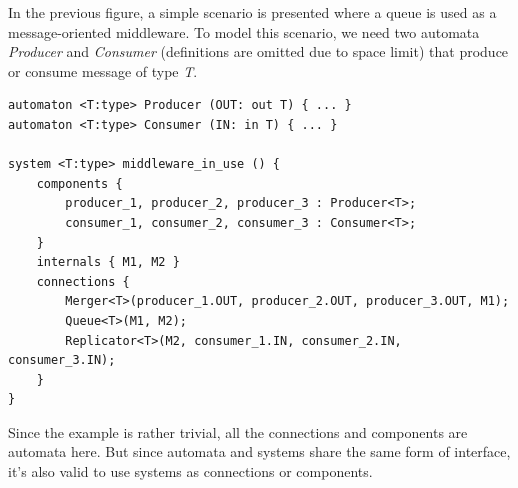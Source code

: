 \begin{example} In the previous figure, a simple scenario is presented where a queue is used as a message-oriented middleware. To model this scenario, we need two automata \emph{Producer} and \emph{Consumer} (definitions are omitted due to space limit) that produce or consume message of type \emph{T}.
\begin{lstlisting}
automaton <T:type> Producer (OUT: out T) { ... }
automaton <T:type> Consumer (IN: in T) { ... }

system <T:type> middleware_in_use () {
    components {
        producer_1, producer_2, producer_3 : Producer<T>;
        consumer_1, consumer_2, consumer_3 : Consumer<T>;
    }
    internals { M1, M2 }
    connections {
        Merger<T>(producer_1.OUT, producer_2.OUT, producer_3.OUT, M1);
        Queue<T>(M1, M2);
        Replicator<T>(M2, consumer_1.IN, consumer_2.IN, consumer_3.IN);
    }
}
\end{lstlisting}
\end{example}

Since the example is rather trivial, all the connections and components are automata here. But since automata and systems share the same form of interface, it's also valid to use systems as connections or components.

\label{subsec:functions}